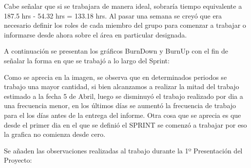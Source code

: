 \documentclass{memoria}
\begin{document}
Cabe señalar que si se trabajara de manera ideal, sobraría  tiempo equivalente a 187.5 hrs - 54.32 hrs = 133.18 hrs. Al pasar una semana se creyó que era necesario definir los roles de cada miembro del grupo para comenzar a trabajar o informarse desde ahora sobre el área en particular designada.

A continuación se presentan los gráficos BurnDown y BurnUp con el fin de señalar la forma en que se trabajó a lo largo del Sprint:


Como se aprecia en la imagen, se observa que en determinados periodos se trabajo una mayor cantidad, si bien alcanzamos a realizar la mitad del trabajo estimado a la fecha 5 de Abril, luego se disminuyó el trabajo realizado por dia a una frecuencia menor, en los últimos días se aumentó la frecuencia de trabajo para el los días antes de la entrega del informe. Otra cosa que se aprecia es que desde el primer dia en el que se definió el SPRINT se comenzó a trabajar por eso la grafica no comienza desde cero.




Se añaden las observaciones realizadas al trabajo durante la 1º Presentación del Proyecto:

\end{document}
